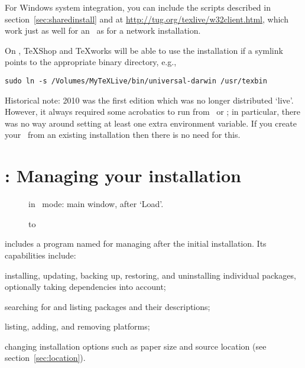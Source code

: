 \documentclass{article}
\begin{document}
For Windows system integration, you can include the 
scripts described in section~\ref{sec:sharedinstall} and at
\url{http://tug.org/texlive/w32client.html}, which work just as well for
an \ISO\ as for a network installation.

On \MacOSX, TeXShop and \TeX{}works will be able to use the 
installation if a symlink  points to the
appropriate binary directory, e.g.,
\begin{verbatim}
sudo ln -s /Volumes/MyTeXLive/bin/universal-darwin /usr/texbin
\end{verbatim}

Historical note: \TL{} 2010 was the first \TL{} edition which was no
longer distributed `live'.  However, it always required some acrobatics
to run from \DVD\ or \ISO; in particular, there was no way around
setting at least one extra environment variable.  If you create your
\ISO\ from an existing installation then there is no need for this.


\section{: Managing your installation}
\label{sec:tlmgr}

\begin{figure}[tb]
\caption{ in \GUI\ mode: main window, after `Load'.}
\label{fig:tlmgr-gui}
\end{figure}

\begin{figure}[tb]
\hbox to 
\end{figure}

\TL{} includes a program named  for managing \TL{} after the
initial installation.  Its capabilities include:

\begin{itemize*}
\item installing, updating, backing up, restoring, and uninstalling
  individual packages, optionally taking dependencies into account;
\item searching for and listing packages and their descriptions;
\item listing, adding, and removing platforms;
\item changing installation options such as paper size and source
  location (see section~\ref{sec:location}).
\end{itemize*}
\end{document}
